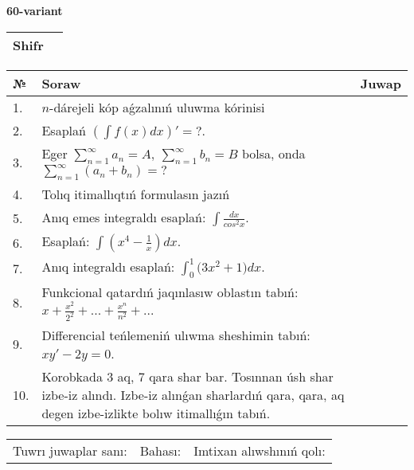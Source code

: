 \documentclass{article}
\begin{document}
  \egroup
  
  \newpage
  
  
  \textbf{60-variant}\\
  
  \bgroup
  \def\arraystretch{1.6} %
  
  \begin{tabular}{|m{5.7cm}|m{9.5cm}|}
  \hline
  Shifr & \\
  \hline
  \end{tabular}
  
  \vspace{1cm}
  
  \begin{tabular}{|m{0.7cm}|m{10cm}|m{4cm}|}
  \hline
  № & Soraw & Juwap \\
  \hline
  1. & \(n\)-dárejeli kóp aǵzalınıń uluwma kórinisi &  \\
  \hline
  2. & Esaplań \(\left( \int{f(x)dx} \right)' = ?\). &  \\
  \hline
  3. & Eger \(\sum_{n = 1}^{\infty}a_{n} = A,\ \sum_{n = 1}^{\infty}b_{n} = B\) bolsa, onda \(\sum_{n = 1}^{\infty}\left( a_{n} + b_{n} \right) = ?\) &  \\
  \hline
  4. & Tolıq itimallıqtıń formulasın jazıń &  \\
  \hline
  5. & Anıq emes integraldı esaplań: \(\int\frac{dx}{cos^2 x}\). &  \\
  \hline
  6. & Esaplań: \(\int\left( x^{4} - \frac{1}{x} \right)dx\). &  \\
  \hline
  7. & Anıq integraldı esaplań: \(\int_{0}^{1}{(3x^2 } + 1)dx\). &  \\
  \hline
  8. & Funkcional qatardıń jaqınlasıw oblastın tabıń: \(x + \frac{x^2 }{2^2 } + ... + \frac{x^{n}}{n^2 } + ...\) &  \\
  \hline
  9. & Differencial teńlemeniń ulıwma sheshimin tabıń: \(xy' - 2y = 0\). &  \\
  \hline
  10. & Korobkada 3 aq, 7 qara shar bar. Tosınnan úsh shar izbe-iz alındı. Izbe-iz alınǵan sharlardıń qara, qara, aq degen izbe-izlikte bolıw itimallıǵın tabıń. &  \\
  \hline
  \end{tabular}
  
  \vspace{1cm}
  
  \begin{tabular}{lll}
  Tuwrı juwaplar sanı: \underline{\hspace{1.5cm}} & 
  Bahası: \underline{\hspace{1.5cm}} & 
  Imtixan alıwshınıń qolı: \underline{\hspace{2cm}} \\
  \end{tabular}
  
\end{document}
